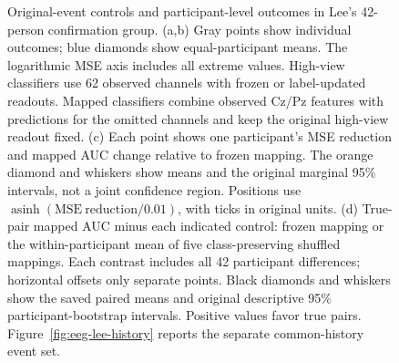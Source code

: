 \begin{figure}[p]
\caption{Original-event controls and participant-level outcomes in Lee's 42-person confirmation group. (a,b) Gray points show individual outcomes; blue diamonds show equal-participant means. The logarithmic MSE axis includes all extreme values. High-view classifiers use 62 observed channels with frozen or label-updated readouts. Mapped classifiers combine observed Cz/Pz features with predictions for the omitted channels and keep the original high-view readout fixed. (c) Each point shows one participant's MSE reduction and mapped AUC change relative to frozen mapping. The orange diamond and whiskers show means and the original marginal 95\% intervals, not a joint confidence region. Positions use $\operatorname{asinh}(\mathrm{MSE\ reduction}/0.01)$, with ticks in original units. (d) True-pair mapped AUC minus each indicated control: frozen mapping or the within-participant mean of five class-preserving shuffled mappings. Each contrast includes all 42 participant differences; horizontal offsets only separate points. Black diamonds and whiskers show the saved paired means and original descriptive 95\% participant-bootstrap intervals. Positive values favor true pairs. Figure~\ref{fig:eeg-lee-history} reports the separate common-history event set.}
\label{fig:eeg-lee-endpoints}
\end{figure}
